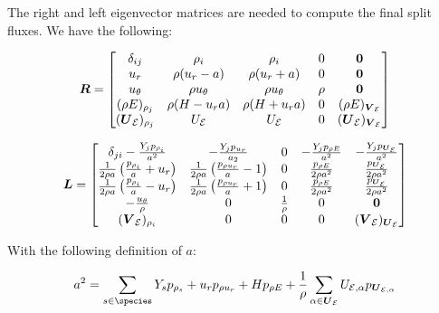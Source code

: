\documentclass[10pt]{article}
\begin{document}
\begin{flushleft}
The right and left eigenvector matrices are needed to compute the final split fluxes. We have the following:

\begin{equation*}
    \boldsymbol{R} = \begin{bmatrix}
        \delta_{ij} & \rho_i & \rho_i & 0 & \boldsymbol{0} \\
        u_r & \rho(u_r - a) & \rho (u_r + a) & 0 & \boldsymbol{0} \\
        u_\theta & \rho u_\theta & \rho u_\theta & \rho & \boldsymbol{0} \\
        (\rho E)_{\rho_j} & \rho(H - u_r a) & \rho(H + u_r a) & 0 & (\rho E)_{\boldsymbol{V}_{\mathcal{E}}} \\
        (\boldsymbol{U}_{\mathcal{E}})_{\rho_j} & U_{\mathcal{E}} & U_{\mathcal{E}} & 0 & (\boldsymbol{U}_{\mathcal{E}})_{\boldsymbol{V}_{\mathcal{E}}}
    \end{bmatrix}
\end{equation*}

\begin{equation*}
    \boldsymbol{L} = \begin{bmatrix}
        \delta_{ji} - \frac{Y_j p_{\rho_i}}{a^2} & -\frac{Y_j p_{u_r}}{a_2} & 0 & -\frac{Y_j p_{\rho E}}{a^2} & -\frac{Y_j p_{\boldsymbol{U}_{\mathcal{E}}}}{a^2} \\
        \frac{1}{2 \rho a} \left( \frac{p_{\rho_i}}{a} + u_r \right) & \frac{1}{2 \rho a} \left( \frac{p_{\rho u_r}}{a} - 1 \right) & 0 & \frac{p_{\rho E}}{2 \rho a^2} & \frac{p_{\boldsymbol{U}_{\mathcal{E}}}}{2 \rho a^2} \\
        \frac{1}{2 \rho a} \left( \frac{p_{\rho_i}}{a} - u_r \right) & \frac{1}{2 \rho a} \left( \frac{p_{\rho u_r}}{a} + 1 \right) & 0 & \frac{p_{\rho E}}{2 \rho a^2} & \frac{p_{\boldsymbol{U}_{\mathcal{E}}}}{2 \rho a^2} \\
         -\frac{u_\theta}{\rho} & 0 & \frac{1}{\rho} & 0 & \boldsymbol{0} \\
         (\boldsymbol{V}_{\mathcal{E}})_{\rho_i} & 0 & 0 & 0 & (\boldsymbol{V}_{\mathcal{E}})_{\boldsymbol{U}_{\mathcal{E}}}
    \end{bmatrix}
\end{equation*}

With the following definition of $a$:

\begin{equation}
    a^2 = \sum_{s \in \species} Y_s p_{\rho_s} + u_r p_{\rho u_r} + H p_{\rho E} + \frac{1}{\rho} \sum_{\alpha \in \bigU_{\mathcal{E}}} U_{\mathcal{E}, \alpha} p_{\bigU_{\mathcal{E}, \alpha}}
\end{equation}



\end{flushleft}
\end{document}
